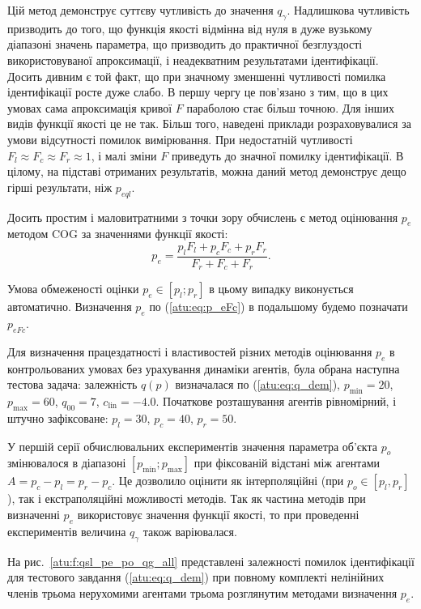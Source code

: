 \documentclass[a4paper,13pt]{atuaref}
\begin{document}
Цій метод демонструє суттєву чутливість до значення $q_\gamma$.
Надлишкова чутливість призводить до того, що функція якості відмінна від нуля в
дуже вузькому діапазоні значень параметра, що призводить до практичної
безглуздості використовуваної апроксимації, і неадекватним результатами
ідентифікації.
Досить дивним є той факт, що при значному зменшенні чутливості помилка
ідентифікації росте дуже слабо. В першу чергу це пов'язано з тим, що в цих
умовах сама апроксимація кривої $F$ параболою стає більш точною. Для інших
видів функції якості це не так. Більш того, наведені приклади розраховувалися
за умови відсутності помилок вимірювання. При недостатній чутливості
$ F_l \approx F_c \approx F_r \approx 1 $, і малі зміни $ F $ приведуть до значної
помилку ідентифікації.
В цілому, на підставі отриманих результатів, можна даний метод демонструє дещо
гірші результати, ніж $ p_{eql} $.

Досить простим і маловитратними з точки зору обчислень є метод оцінювання $ p_e $ методом
COG за значеннями функції якості:
%
\begin{equation}
  p_e =
  \frac{p_l F_l + p_c F_c + p_r F_r}{ F_r + F_c + F_r}  .
  \label{atu:eq:p_eFc}
\end{equation}

Умова обмеженості оцінки $ p_e \in [p_l; p_r] $ в цьому випадку виконується
автоматично. Визначення $ p_e $ по (\ref{atu:eq:p_eFc}) в подальшому будемо позначати $p_{eFc}$.

Для визначення працездатності і властивостей різних методів оцінювання $ p_e $
в контрольованих умовах без урахування динаміки агентів, була обрана наступна
тестова задача: залежність $ q (p) $ визначалася по (\ref{atu:eq:q_dem}),
$p_{\min}=20$, $p_{\max}=60$,
$q_{00}=7$, $c_\mathrm{lin}=-4.0$.
Початкове розташування агентів рівномірний, і штучно зафіксоване:
$p_l=30$, $p_c=40$,  $p_r=50$.

У першій серії обчислювальних експериментів значення параметра об'єкта $ p_o $
змінювалося в діапазоні $ [p_ {\min}; p_{\max}] $ при фіксованій відстані
між агентами $ A = p_c - p_l = p_r - p_c $. Це дозволило оцінити як
інтерполяційні (при $ p_o \in [p_l, p_r] $), так і екстраполяційні можливості
методів. Так як частина методів при визначенні $ p_e $ використовує значення
функції якості, то при проведенні експериментів величина $ q_\gamma $ також
варіювалася.

На рис.~\ref{atu:f:qsl_pe_po_qg_all} представлені залежності помилок
ідентифікації для тестового завдання (\ref{atu:eq:q_dem}) при повному
комплекті нелінійних членів  трьома нерухомими
агентами трьома розглянутим методами визначення $ p_e $.
\end{document}
